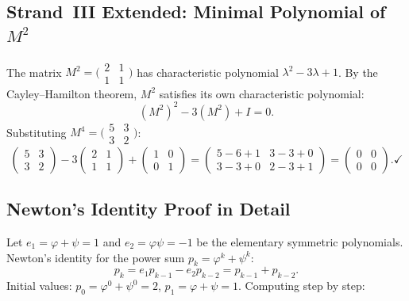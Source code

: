 \subsection{Strand~III Extended: Minimal Polynomial of $M^{2}$}

The matrix $M^{2} = \bigl(\begin{smallmatrix}2&1\\1&1\end{smallmatrix}\bigr)$
has characteristic polynomial $\lambda^{2}-3\lambda+1$.
By the Cayley--Hamilton theorem, $M^{2}$ satisfies its own
characteristic polynomial:
\[
  (M^{2})^{2} - 3(M^{2}) + I = 0.
\]
Substituting $M^{4} = \bigl(\begin{smallmatrix}5&3\\3&2\end{smallmatrix}\bigr)$:
\[
  \begin{pmatrix}5&3\\3&2\end{pmatrix}
  - 3\begin{pmatrix}2&1\\1&1\end{pmatrix}
  + \begin{pmatrix}1&0\\0&1\end{pmatrix}
  = \begin{pmatrix}5-6+1 & 3-3+0 \\ 3-3+0 & 2-3+1\end{pmatrix}
  = \begin{pmatrix}0&0\\0&0\end{pmatrix}.
  \checkmark
\]

\subsection{Newton's Identity Proof in Detail}

Let $e_{1} = \varphi+\psi = 1$ and $e_{2} = \varphi\psi = -1$
be the elementary symmetric polynomials.
Newton's identity for the power sum $p_{k} = \varphi^{k}+\psi^{k}$:
\[
  p_{k} = e_{1}p_{k-1} - e_{2}p_{k-2}
        = p_{k-1} + p_{k-2}.
\]
Initial values: $p_{0} = \varphi^{0}+\psi^{0} = 2$,
$p_{1} = \varphi+\psi = 1$.
Computing step by step:
\begin{center}
\end{center}

